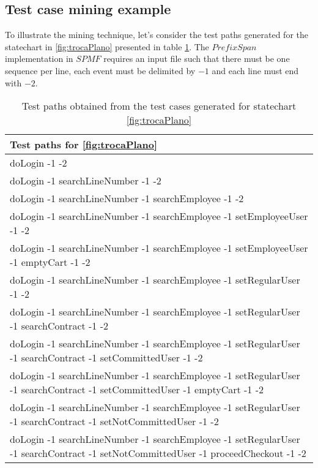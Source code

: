 \subsection{Test case mining example}
\label{exampleTestMin}

To illustrate the mining technique, let's consider the test paths generated for the statechart in \ref{fig:trocaPlano} presented in table \ref{testPathsTrocaPlano}. The $PrefixSpan$ implementation in $SPMF$ requires an input file such that there must be one sequence per line, each event must be delimited by $-1$ and each line must end with $-2$.


\begin{table}[h]
\begin{center}
\begin{tabular}{|p{15cm}|}
\hline
\textbf{Test paths for \ref{fig:trocaPlano}}\\ \hline

doLogin -1 -2 \\ \hline
doLogin -1 searchLineNumber -1 -2\\ \hline
doLogin -1 searchLineNumber -1 searchEmployee -1 -2\\ \hline
doLogin -1 searchLineNumber -1 searchEmployee -1 setEmployeeUser -1 -2\\ \hline
doLogin -1 searchLineNumber -1 searchEmployee -1 setEmployeeUser -1 emptyCart -1 -2\\ \hline
doLogin -1 searchLineNumber -1 searchEmployee -1 setRegularUser -1 -2\\ \hline
doLogin -1 searchLineNumber -1 searchEmployee -1 setRegularUser -1 searchContract -1 -2\\ \hline
doLogin -1 searchLineNumber -1 searchEmployee -1 setRegularUser -1 searchContract -1 setCommittedUser -1 -2\\ \hline
doLogin -1 searchLineNumber -1 searchEmployee -1 setRegularUser -1 searchContract -1 setCommittedUser -1 emptyCart -1 -2\\ \hline
doLogin -1 searchLineNumber -1 searchEmployee -1 setRegularUser -1 searchContract -1 setNotCommittedUser -1 -2\\ \hline
doLogin -1 searchLineNumber -1 searchEmployee -1 setRegularUser -1 searchContract -1 setNotCommittedUser -1 proceedCheckout -1 -2\\

\hline
\end{tabular}
\end{center}
\caption{Test paths obtained from the test cases generated for statechart \ref{fig:trocaPlano}}
\label{testPathsTrocaPlano}
\end{table}


